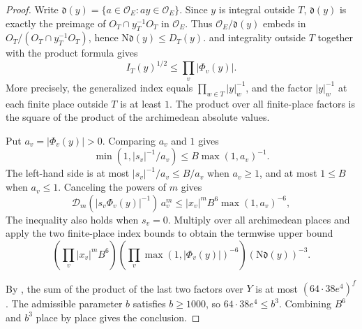 \begin{proof}
Write $\mathfrak d(y)=\{a\in\mathcal O_E:ay\in\mathcal O_E\}$.
Since $y$ is integral outside $T$, $\mathfrak d(y)$ is exactly
the preimage of $O_T\cap y_T^{-1}O_T$ in $\mathcal O_E$.
Thus $\mathcal O_E/\mathfrak d(y)$ embeds in $O_T/(O_T\cap y_T^{-1}O_T)$,
hence $\mathrm N\mathfrak d(y)\le D_T(y)$.
and integrality outside $T$ together with the product formula gives
\[
 I_T(y)^{1/2}\le\prod_v|\Phi_v(y)|.
\]
More precisely, the generalized index equals $\prod_{w\in T}|y|_w^{-1}$,
and the factor $|y|_w^{-1}$ at each finite place outside $T$ is at least $1$.
The product over all finite-place factors is the square of the product of the archimedean absolute values.

Put $a_v=|\Phi_v(y)|>0$. Comparing $a_v$ and $1$ gives
\[
 \min(1,|s_v|^{-1}/a_v)\le B\max(1,a_v)^{-1}.
\]
The left-hand side is at most $|s_v|^{-1}/a_v\le B/a_v$ when $a_v\ge1$,
and at most $1\le B$ when $a_v\le1$. Canceling the powers of $m$ gives
\[
 \mathcal D_m(|s_v\Phi_v(y)|^{-1})\,a_v^m
 \le |x_v|^m B^6\max(1,a_v)^{-6},
\]
The inequality also holds when $s_v=0$. Multiply over all archimedean places and apply the two finite-place index bounds
to obtain the termwise upper bound
\[
  \left(\prod_v |x_v|^m B^6\right)
  \left(\prod_v\max(1,|\Phi_v(y)|)^{-6}\right)
  (\mathrm N\mathfrak d(y))^{-3}.
\]

By , the sum of the product of the last two factors over $Y$ is at most $(64\cdot38e^4)^f$.
The admissible parameter $b$ satisfies $b\ge1000$, so $64\cdot38e^4\le b^3$.
Combining $B^6$ and $b^3$ place by place gives the conclusion.
\end{proof}

